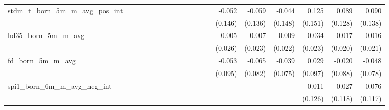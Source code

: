 \begin{tabular}{lrrrrrrrrrrrrrrrrrr}
stdm\_t\_born\_5m\_m\_avg\_pos\_int         &             &             &             &             &             &             &             &             &             &             &             &             &      -0.052 &      -0.059 &      -0.044 &       0.125 &       0.089 &       0.090 \\ 
                                            &             &             &             &             &             &             &             &             &             &             &             &             &     (0.146) &     (0.136) &     (0.148) &     (0.151) &     (0.128) &     (0.138) \\ 
hd35\_born\_5m\_m\_avg                      &             &             &             &             &             &             &             &             &             &             &             &             &      -0.005 &      -0.007 &      -0.009 &      -0.034 &      -0.017 &      -0.016 \\ 
                                            &             &             &             &             &             &             &             &             &             &             &             &             &     (0.026) &     (0.023) &     (0.022) &     (0.023) &     (0.020) &     (0.021) \\ 
fd\_born\_5m\_m\_avg                        &             &             &             &             &             &             &             &             &             &             &             &             &      -0.053 &      -0.065 &      -0.039 &       0.029 &      -0.020 &      -0.048 \\ 
                                            &             &             &             &             &             &             &             &             &             &             &             &             &     (0.095) &     (0.082) &     (0.075) &     (0.097) &     (0.088) &     (0.078) \\ 
spi1\_born\_6m\_m\_avg\_neg\_int            &             &             &             &             &             &             &             &             &             &             &             &             &             &             &             &       0.011 &       0.027 &       0.076 \\ 
                                            &             &             &             &             &             &             &             &             &             &             &             &             &             &             &             &     (0.126) &     (0.118) &     (0.117) \\ 

\end{tabular}
